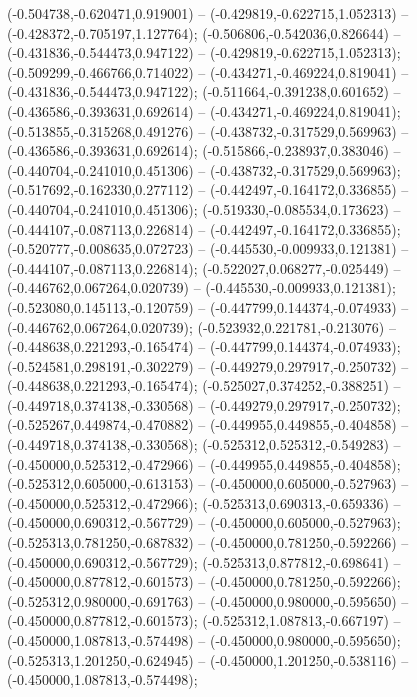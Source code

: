  (-0.504738,-0.620471,0.919001) -- (-0.429819,-0.622715,1.052313) -- (-0.428372,-0.705197,1.127764);
 (-0.506806,-0.542036,0.826644) -- (-0.431836,-0.544473,0.947122) -- (-0.429819,-0.622715,1.052313);
 (-0.509299,-0.466766,0.714022) -- (-0.434271,-0.469224,0.819041) -- (-0.431836,-0.544473,0.947122);
 (-0.511664,-0.391238,0.601652) -- (-0.436586,-0.393631,0.692614) -- (-0.434271,-0.469224,0.819041);
 (-0.513855,-0.315268,0.491276) -- (-0.438732,-0.317529,0.569963) -- (-0.436586,-0.393631,0.692614);
 (-0.515866,-0.238937,0.383046) -- (-0.440704,-0.241010,0.451306) -- (-0.438732,-0.317529,0.569963);
 (-0.517692,-0.162330,0.277112) -- (-0.442497,-0.164172,0.336855) -- (-0.440704,-0.241010,0.451306);
 (-0.519330,-0.085534,0.173623) -- (-0.444107,-0.087113,0.226814) -- (-0.442497,-0.164172,0.336855);
 (-0.520777,-0.008635,0.072723) -- (-0.445530,-0.009933,0.121381) -- (-0.444107,-0.087113,0.226814);
 (-0.522027,0.068277,-0.025449) -- (-0.446762,0.067264,0.020739) -- (-0.445530,-0.009933,0.121381);
 (-0.523080,0.145113,-0.120759) -- (-0.447799,0.144374,-0.074933) -- (-0.446762,0.067264,0.020739);
 (-0.523932,0.221781,-0.213076) -- (-0.448638,0.221293,-0.165474) -- (-0.447799,0.144374,-0.074933);
 (-0.524581,0.298191,-0.302279) -- (-0.449279,0.297917,-0.250732) -- (-0.448638,0.221293,-0.165474);
 (-0.525027,0.374252,-0.388251) -- (-0.449718,0.374138,-0.330568) -- (-0.449279,0.297917,-0.250732);
 (-0.525267,0.449874,-0.470882) -- (-0.449955,0.449855,-0.404858) -- (-0.449718,0.374138,-0.330568);
 (-0.525312,0.525312,-0.549283) -- (-0.450000,0.525312,-0.472966) -- (-0.449955,0.449855,-0.404858);
 (-0.525312,0.605000,-0.613153) -- (-0.450000,0.605000,-0.527963) -- (-0.450000,0.525312,-0.472966);
 (-0.525313,0.690313,-0.659336) -- (-0.450000,0.690312,-0.567729) -- (-0.450000,0.605000,-0.527963);
 (-0.525313,0.781250,-0.687832) -- (-0.450000,0.781250,-0.592266) -- (-0.450000,0.690312,-0.567729);
 (-0.525313,0.877812,-0.698641) -- (-0.450000,0.877812,-0.601573) -- (-0.450000,0.781250,-0.592266);
 (-0.525312,0.980000,-0.691763) -- (-0.450000,0.980000,-0.595650) -- (-0.450000,0.877812,-0.601573);
 (-0.525312,1.087813,-0.667197) -- (-0.450000,1.087813,-0.574498) -- (-0.450000,0.980000,-0.595650);
 (-0.525313,1.201250,-0.624945) -- (-0.450000,1.201250,-0.538116) -- (-0.450000,1.087813,-0.574498);
